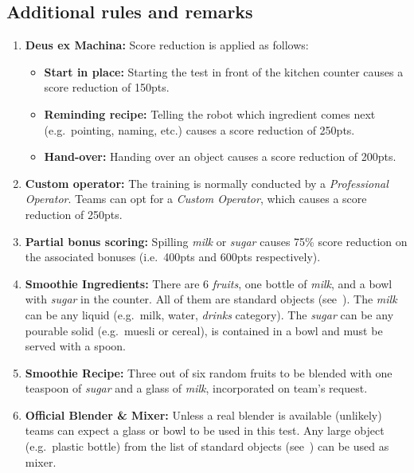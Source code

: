 \subsection*{Additional rules and remarks}
\begin{enumerate}
	\item \textbf{Deus ex Machina:} Score reduction is applied as follows:
	\begin{itemize}[nosep]
		\item \textbf{Start in place:} Starting the test in front of the kitchen counter causes a score reduction of 150pts.
		\item \textbf{Reminding recipe:} Telling the robot which ingredient comes next (e.g.~pointing, naming, etc.) causes a score reduction of 250pts.
		\item \textbf{Hand-over:} Handing over an object causes a score reduction of 200pts.
	\end{itemize}

	\item \textbf{Custom operator:} The training is normally conducted by a \emph{Professional Operator}. Teams can opt for a \emph{Custom Operator}, which causes a score reduction of 250pts.

	\item \textbf{Partial bonus scoring:} Spilling \emph{milk} or \emph{sugar} causes 75\% score reduction on the associated bonuses (i.e.~400pts and 600pts respectively).

	\item \textbf{Smoothie Ingredients:} There are 6 \emph{fruits}, one bottle of \emph{milk}, and a bowl with \emph{sugar} in the counter.
	All of them are standard objects (see~).
	The \emph{milk} can be any liquid (e.g.~milk, water, \emph{drinks} category).
	The \emph{sugar} can be any pourable solid (e.g.~muesli or cereal), is contained in a bowl and must be served with a spoon.

	\item \textbf{Smoothie Recipe:} Three out of six random fruits to be blended with one teaspoon of \emph{sugar} and a glass of \emph{milk}, incorporated on team's request.

	\item \textbf{Official Blender \& Mixer:} Unless a real blender is available (unlikely) teams can expect a glass or bowl to be used in this test. Any large object (e.g.~plastic bottle) from the list of standard objects (see~) can be used as mixer.
\end{enumerate}

